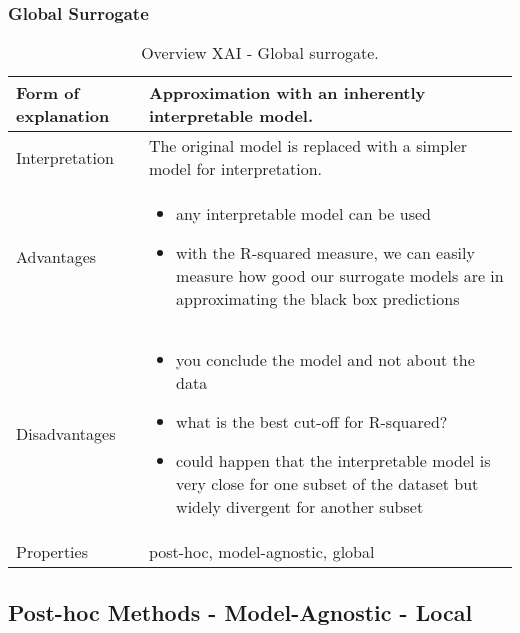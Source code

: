 \subsubsection{Global Surrogate}
\begin{table}[H]
  \centering
  \begin{tabular}{|p{}|p{}|}
    \hline
    Form of \newline explanation & 
    Approximation with an inherently interpretable model. \\
    
    \hline
    Interpretation & 
    The original model is replaced with a simpler model for interpretation.\\
    \hline
    Advantages &
    \begin{itemize}[nosep, left=0em]
        \item any interpretable model can be used
        \item with the R-squared measure, we can easily measure how good our surrogate models are in approximating the black box predictions
    \end{itemize} \\
    
    \hline
    Disadvantages &
    \begin{itemize}[nosep, left=0em]
        \item you conclude the model and not about the data
        \item what is the best cut-off for R-squared?
        \item could happen that the interpretable model is very close for one subset of the dataset but widely divergent for another subset
    \end{itemize} \\
    
    \hline
    Properties & 
    post-hoc, model-agnostic, global  \\
    
    \hline
  \end{tabular}
  \caption{Overview XAI - Global surrogate.}
  \label{tab:XAIGlobSur}
\end{table}

\subsection{Post-hoc Methods - Model-Agnostic - Local}

